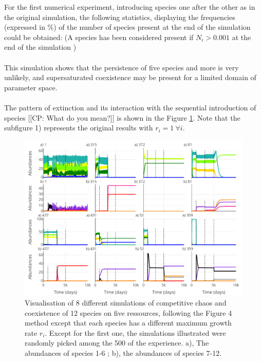 For the first numerical experiment, introducing species one after the other as in the 
original simulation, the following statistics, displaying the frequencies 
(expressed in \%) of the number of species present at the end of the simulation 
could be obtained: (A species has been considered present if $N_i > 0.001$ at 
the end of the simulation )\\


\\
This simulation shows that the persistence of five species and more is 
very unlikely, and supersaturated coexistence may be present for a limited domain of parameter space.\\
\\
The pattern of extinction and its interaction with the sequential introduction of 
species {\color{blue}[[CP: What do you mean?]]} is shown in the Figure \ref{figures:Figexp1}. Note that 
the subfigure 1) represents the original results with $r_i=1 ~\forall i$. 
\begin{figure}[H]
\begin{center} 
 \includegraphics[width=1\textwidth]{../Code/Figures/Figure_exp1.pdf}
  \caption{Visualisation of 8 different simulations of competitive chaos and 
coexistence of 12 species on five ressources, following the Figure 4 method 
except that each species has a different maximum growth rate $r_i$. Except for the first one, the 
simulations illustrated were randomly picked among the 500 of the experience. 
a), The abundances of species 1-6 ; b), the abundances of species 7-12.}
  \label{figures:Figexp1}
\end{center}
\end{figure}

